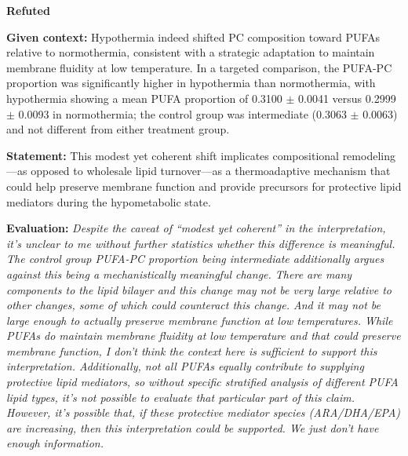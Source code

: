 \documentclass{article}
\begin{document}
\vspace{0.5em}
\noindent\textbf{\large Refuted}

\vspace{0.5em}
\noindent\textbf{Given context:} Hypothermia indeed shifted PC composition toward PUFAs relative to normothermia, consistent with a strategic adaptation to maintain membrane fluidity at low temperature. In a targeted comparison, the PUFA-PC proportion was significantly higher in hypothermia than normothermia, with hypothermia showing a mean PUFA proportion of 0.3100 $\pm$ 0.0041 versus 0.2999 $\pm$ 0.0093 in normothermia; the control group was intermediate (0.3063 $\pm$ 0.0063) and not different from either treatment group.

\vspace{0.5em}
\noindent\textbf{Statement:} This modest yet coherent shift implicates compositional remodeling---as opposed to wholesale lipid turnover---as a thermoadaptive mechanism that could help preserve membrane function and provide precursors for protective lipid mediators during the hypometabolic state.

\vspace{0.5em}
\noindent\textbf{Evaluation:} \textit{Despite the caveat of ``modest yet coherent'' in the interpretation, it's unclear to me without further statistics whether this difference is meaningful. The control group PUFA-PC proportion being intermediate additionally argues against this being a mechanistically meaningful change. There are many components to the lipid bilayer and this change may not be very large relative to other changes, some of which could counteract this change. And it may not be large enough to actually preserve membrane function at low temperatures. While PUFAs do maintain membrane fluidity at low temperature and that \textit{could} preserve membrane function, I don't think the context here is sufficient to support this interpretation. Additionally, not all PUFAs equally contribute to supplying protective lipid mediators, so without specific stratified analysis of different PUFA lipid types, it's not possible to evaluate that particular part of this claim. However, it's possible that, if these protective mediator species (ARA/DHA/EPA) are increasing, then this interpretation could be supported. We just don't have enough information.}
\vspace{1em}
\end{document}
